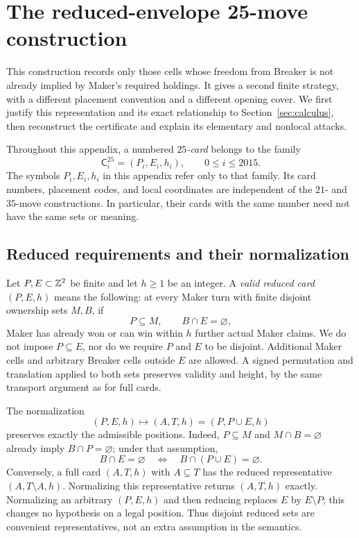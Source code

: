 \section{The reduced-envelope 25-move construction}\label{app:route25}

This construction records only those cells whose freedom from Breaker
is not already implied by Maker's required holdings.  It gives a second
finite strategy, with a different placement convention and a different
opening cover.  We first justify this representation and its exact
relationship to Section~\ref{sec:calculus}, then reconstruct the
certificate and explain its elementary and nonlocal attacks.

Throughout this appendix, a numbered \emph{$25$-card} belongs to the
family
\[
 \mathsf C^{25}_i=(P_i,E_i,h_i),\qquad 0\leq i\leq2015.
\]
The symbols $P_i,E_i,h_i$ in this appendix refer only to that family.
Its card numbers, placement codes, and local coordinates are independent
of the $21$- and $35$-move constructions.  In particular, their cards
with the same number need not have the same sets or meaning.

\subsection{Reduced requirements and their normalization}
\label{r25:semantics}

Let $P,E\subset\mathbb Z^2$ be finite and let $h\geq1$ be an integer.  A
\emph{valid reduced card} $(P,E,h)$ means the following: at every Maker turn with
finite disjoint ownership sets $M,B$, if
\begin{equation}\label{r25:condition}
 P\subseteq M,\qquad B\cap E=\varnothing,
\end{equation}
Maker has already won or can win within $h$ further actual Maker
claims.  We do not impose $P\subseteq E$, nor do we require $P$ and
$E$ to be disjoint.  Additional Maker cells and arbitrary Breaker
cells outside $E$ are allowed.  A signed permutation and translation
applied to both sets preserves validity and height, by the same
transport argument as for full cards.

The normalization
\begin{equation}\label{r25:normalization}
 (P,E,h)\longmapsto (A,T,h)=(P,P\cup E,h)
\end{equation}
preserves exactly the admissible positions.  Indeed, $P\subseteq M$
and $M\cap B=\varnothing$ already imply $B\cap P=\varnothing$;
under that assumption,
\[
 B\cap E=\varnothing
 \quad\Longleftrightarrow\quad
 B\cap(P\cup E)=\varnothing.
\]
Conversely, a full card $(A,T,h)$ with $A\subseteq T$ has the reduced
representative $(A,T\setminus A,h)$.  Normalizing this representative
returns $(A,T,h)$ exactly.  Normalizing an arbitrary $(P,E,h)$ and then
reducing replaces $E$ by $E\setminus P$; this changes no hypothesis
on a legal position.  Thus disjoint reduced sets are convenient
representatives, not an extra assumption in the semantics.

